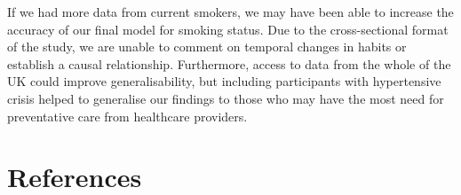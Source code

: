 \documentclass[
  11pt,
  twocolumn]{article}
\begin{document}
If we had more data from current smokers, we may have been able to
increase the accuracy of our final model for smoking status. Due to the
cross-sectional format of the study, we are unable to comment on
temporal changes in habits or establish a causal relationship.
Furthermore, access to data from the whole of the UK could improve
generalisability, but including participants with hypertensive crisis
helped to generalise our findings to those who may have the most need
for preventative care from healthcare providers.

\clearpage
\onecolumn

\hypertarget{references}{%
\section*{References}\label{references}}
\end{document}
